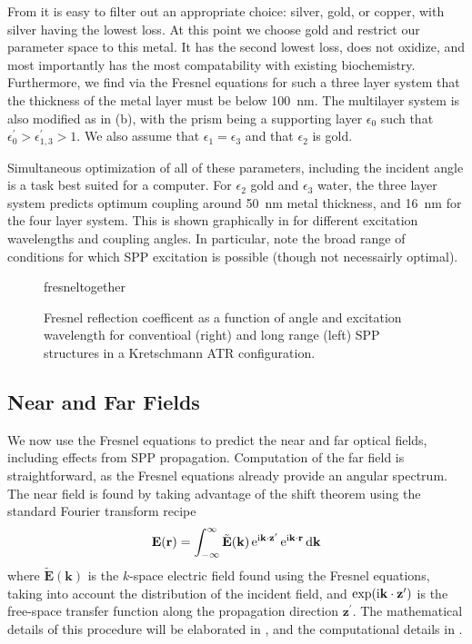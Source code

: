 From  it is easy to filter out an appropriate
choice: silver, gold, or copper, with silver having the lowest loss.  At
this point we choose gold and restrict our parameter space to this metal.
It has the second lowest loss, does not oxidize, and most importantly has
the most compatability with existing biochemistry.  Furthermore, we find
via the Fresnel equations for such a three layer system that the thickness
of the metal layer must be below \SI{100}{\nano\meter}.  The multilayer
system is also modified as in (b), with the
prism being a supporting layer $\epsilon_0$ such that
$\epsilon^\prime_0>\epsilon^\prime_{1,3}>1$.  We also assume that
$\epsilon_1=\epsilon_3$ and that $\epsilon_2$ is gold.

Simultaneous optimization of all of these parameters, including the
incident angle is a task best suited for a computer.  For $\epsilon_2$ gold
and $\epsilon_3$ water, the three layer system predicts optimum coupling
around \SI{50}{\nano\meter} metal thickness, and \SI{16}{\nano\meter} for
the four layer system.  This is shown graphically in
 for different excitation wavelengths and coupling
angles.  In particular, note the broad range of conditions for which SPP
excitation is possible (though not necessairly optimal).

\begin{figure}[ht]
\centering
{fresneltogether}
\caption{Fresnel reflection coefficent as a function of angle and
excitation wavelength for conventioal (right) and long range (left) SPP structures in a Kretschmann ATR 
configuration.}
\label{fig:fresnelangle}
\end{figure}

\subsection{Near and Far Fields} \label{sec:fresnelnearfar}
We now use the Fresnel equations to predict the near and far optical
fields, including effects from SPP propagation.  Computation of the far
field is straightforward, as the Fresnel equations already provide an
angular spectrum.  The near field is found by taking advantage of the shift
theorem using the standard Fourier transform recipe
\begin{equation}
\mathbf{E}(\mathbf{r}) = \int_{-\infty}^{\infty} \tilde{\mathbf{E}}(\mathbf{k})
\,{\mathrm{e}}^{{\mathrm{i}} \mathbf{k} \cdot \mathbf{z}^\prime}
\,{\mathrm{e}}^{{\mathrm{i}} \mathbf{k} \cdot \mathbf{r}}\,\mathrm{d} \mathbf{k}
\end{equation}
where $\tilde{\mathbf{E}}(\mathbf{k})$ is the $k$-space electric field
found using the Fresnel equations, taking into account the distribution of
the incident field, and $\exp({\mathrm{i}} \mathbf{k} \cdot
\mathbf{z}^\prime)$ is the free-space transfer function along the 
propagation direction $\mathbf{z}^\prime$.  The mathematical details of this procedure
will be elaborated in , and the
computational details in .

